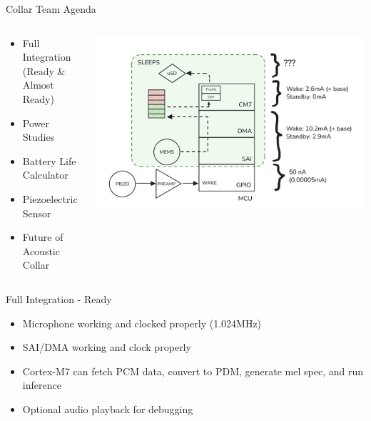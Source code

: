 \begin{frame}{Collar Team Agenda}
    \begin{columns}
        \begin{column}{0.5\textwidth}
            \begin{itemize}
                \item Full Integration (Ready \& Almost Ready)
                \item Power Studies
                \item Battery Life Calculator
                \item Piezoelectric Sensor
                \item Future of Acoustic Collar
            \end{itemize}
        \end{column}
        \begin{column}{0.5\textwidth}
            \includegraphics[height=1\textheight,width=1\textwidth,keepaspectratio]{images/FullSystemDiagram.png}
        \end{column}
    \end{columns}
\end{frame}

\begin{frame}{Full Integration - Ready}
    \begin{itemize}
        \item Microphone working and clocked properly (1.024MHz)
        \item SAI/DMA working and clock properly
        \item Cortex-M7 can fetch PCM data, convert to PDM, generate mel spec, and run inference
        \item Optional audio playback for debugging
    \end{itemize}
\end{frame}

